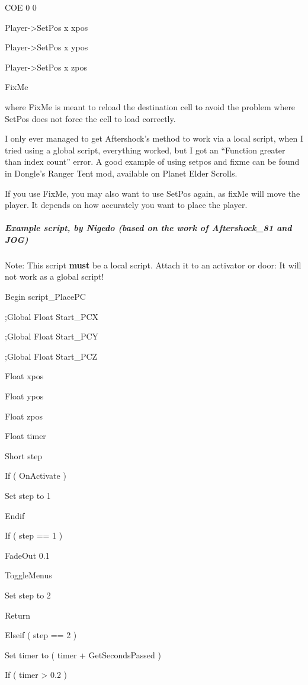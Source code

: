 \documentclass[
]{article}
\begin{document}
COE 0 0

Player-\textgreater SetPos x xpos

Player-\textgreater SetPos x ypos

Player-\textgreater SetPos x zpos

FixMe

where FixMe is meant to reload the destination cell to avoid the problem
where SetPos does not force the cell to load correctly.

I only ever managed to get Aftershock's method to work via a local
script, when I tried using a global script, everything worked, but I got
an ``Function greater than index count'' error. A good example of using
setpos and fixme can be found in Dongle's Ranger Tent mod, available on
Planet Elder Scrolls.

If you use FixMe, you may also want to use SetPos again, as fixMe will
move the player. It depends on how accurately you want to place the
player.

\hypertarget{example-script-by-nigedo-based-on-the-work-of-aftershock_81-and-jog}{%
\subparagraph{Example script, by Nigedo (based on the work of
Aftershock\_81 and
JOG)}\label{example-script-by-nigedo-based-on-the-work-of-aftershock_81-and-jog}}

Note: This script \textbf{must} be a local script. Attach it to an
activator or door: It will not work as a global script!

Begin script\_PlacePC

;Global Float Start\_PCX

;Global Float Start\_PCY

;Global Float Start\_PCZ

Float xpos

Float ypos

Float zpos

Float timer

Short step

If ( OnActivate )

Set step to 1

Endif

If ( step == 1 )

FadeOut 0.1

ToggleMenus

Set step to 2

Return

Elseif ( step == 2 )

Set timer to ( timer + GetSecondsPassed )

If ( timer \textgreater{} 0.2 )
\end{document}
